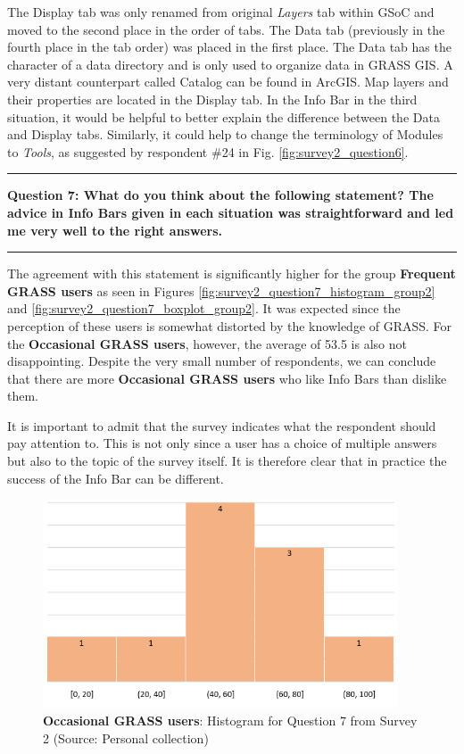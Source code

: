 \documentclass[a4paper,10pt,twoside]{article}
\begin{document}
\newpage
\noindent The Display tab was only renamed from original \textit{Layers} tab within GSoC and moved to the second place in the order of tabs. The Data tab (previously in the fourth place in the tab order) was placed in the first place. The Data tab has the character of a data directory and is only used to organize data in GRASS GIS. A very distant counterpart called Catalog can be found in ArcGIS. Map layers and their properties are located in the Display tab. In the Info Bar in the third situation, it would be helpful to better explain the difference between the Data and Display tabs. Similarly, it could help to change the terminology of Modules to \textit{Tools}, as suggested by respondent \#24 in Fig. \ref{fig:survey2_question6}.

\par\noindent\rule{\textwidth}{0.4pt}
\noindent \textbf{Question 7: What do you think about the following statement? The advice in Info Bars given in each situation was straightforward and led me very well to the right answers.}
\par\noindent\rule{\textwidth}{0.4pt}

\noindent The agreement with this statement is significantly higher for the group \textbf{Frequent GRASS users} as seen in Figures \ref{fig:survey2_question7_histogram_group2} and \ref{fig:survey2_question7_boxplot_group2}. It was expected since the perception of these users is somewhat distorted by the knowledge of GRASS. For the \textbf{Occasional GRASS users}, however, the average of 53.5 is also not disappointing. Despite the very small number of respondents, we can conclude that there are more \textbf{Occasional GRASS users} who like Info Bars than dislike them.

It is important to admit that the survey indicates what the respondent should pay attention to. This is not only since a user has a choice of multiple answers but also to the topic of the survey itself. It is therefore clear that in practice the success of the Info Bar can be different.

\vspace{0.3cm}
\begin{figure}[hbt!] 
\begin{center}
\includegraphics[width=10.5cm]{../surveys/analyzed_data/survey2_question7_histogram_group1.png} 
\caption[\textbf{Occasional GRASS users}: Histogram for Question 7 from Survey 2]{\textbf{Occasional GRASS users}: Histogram for Question 7 from Survey 2 (Source: Personal collection)}
\label{fig:survey2_question7_histogram_group1}
\end{center}
\end{figure}
\end{document}
